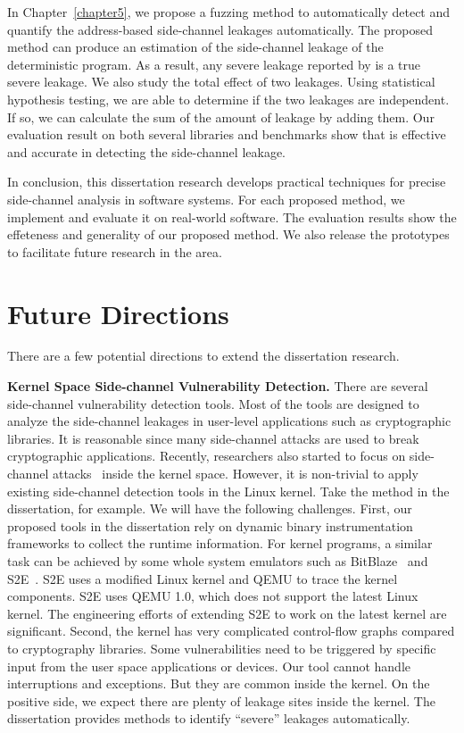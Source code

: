 In Chapter~\ref{chapter5}, we propose a fuzzing method to automatically detect and quantify the address-based side-channel leakages automatically. The proposed method can produce an estimation of the side-channel leakage of the deterministic program. As a result, any severe leakage reported by \ctool{} is a true severe leakage. We also study the total effect of two leakages. Using statistical hypothesis testing, we are able to determine if the two leakages are independent. If so, we can calculate the sum of the amount of leakage by adding them. Our evaluation result on both several libraries and benchmarks show that \ctool{} is effective and accurate in detecting the side-channel leakage.

In conclusion, this dissertation research develops practical techniques for precise side-channel analysis in software systems. For each proposed method, we implement and evaluate it on real-world software. The evaluation results show the effeteness and generality of our proposed method.  We also release the prototypes to facilitate future research in the area.
\section{Future Directions}
There are a few potential directions to extend the dissertation research. 

\textbf{Kernel Space Side-channel Vulnerability Detection.} There are several side-channel vulnerability detection tools. Most of the tools are designed to analyze the side-channel leakages in user-level applications such as cryptographic libraries. It is reasonable since many side-channel attacks are used to break cryptographic applications. Recently, researchers also started to focus on side-channel attacks~\cite{cao2016off} inside the kernel space. However, it is non-trivial to apply existing side-channel detection tools in the Linux kernel. Take the method in the dissertation, for example. We will have the following challenges. First, our proposed tools in the dissertation rely on dynamic binary instrumentation frameworks to collect the runtime information. For kernel programs, a similar task can be achieved by some whole system emulators such as BitBlaze~\cite{song2008bitblaze} and S2E~\cite{chipounov2012s2e}. S2E uses a modified Linux kernel and QEMU to trace the kernel components. S2E uses QEMU 1.0, which does not support the latest Linux kernel. The engineering efforts of extending S2E to work on the latest kernel are significant. Second, the kernel has very complicated control-flow graphs compared to cryptography libraries. Some vulnerabilities need to be triggered by specific input from the user space applications or devices. Our tool cannot handle interruptions and exceptions. But they are common inside the kernel. On the positive side, we expect there are plenty of leakage sites inside the kernel. The dissertation provides methods to identify ``severe'' leakages automatically.


